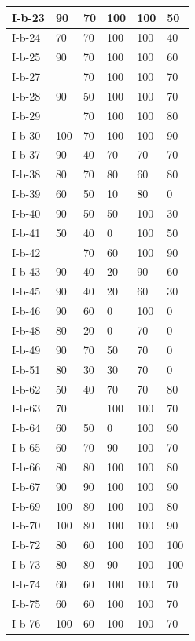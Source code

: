 \documentclass[11pt,a4paper]{article}
\begin{document}
\begin{table}[h]
\begin{tabular}{|l|l|l|l|l|l|}
I-b-23 & 90 & 70 & 100 & 100 & 50 \\ \hline
I-b-24 & 70 & 70 & 100 & 100 & 40 \\ \hline
I-b-25 & 90 & 70 & 100 & 100 & 60 \\ \hline
I-b-27 &  & 70 & 100 & 100 & 70 \\ \hline
I-b-28 & 90 & 50 & 100 & 100 & 70 \\ \hline
I-b-29 &  & 70 & 100 & 100 & 80 \\ \hline
I-b-30 & 100 & 70 & 100 & 100 & 90 \\ \hline
I-b-37 & 90 & 40 & 70 & 70 & 70 \\ \hline
I-b-38 & 80 & 70 & 80 & 60 & 80 \\ \hline
I-b-39 & 60 & 50 & 10 & 80 & 0 \\ \hline
I-b-40 & 90 & 50 & 50 & 100 & 30 \\ \hline
I-b-41 & 50 & 40 & 0 & 100 & 50 \\ \hline
I-b-42 &  & 70 & 60 & 100 & 90 \\ \hline
I-b-43 & 90 & 40 & 20 & 90 & 60 \\ \hline
I-b-45 & 90 & 40 & 20 & 60 & 30 \\ \hline
I-b-46 & 90 & 60 & 0 & 100 & 0 \\ \hline
I-b-48 & 80 & 20 & 0 & 70 & 0 \\ \hline
I-b-49 & 90 & 70 & 50 & 70 & 0 \\ \hline
I-b-51 & 80 & 30 & 30 & 70 & 0 \\ \hline
I-b-62 & 50 & 40 & 70 & 70 & 80 \\ \hline
I-b-63 & 70 &  & 100 & 100 & 70 \\ \hline
I-b-64 & 60 & 50 & 0 & 100 & 90 \\ \hline
I-b-65 & 60 & 70 & 90 & 100 & 70 \\ \hline
I-b-66 & 80 & 80 & 100 & 100 & 80 \\ \hline
I-b-67 & 90 & 90 & 100 & 100 & 90 \\ \hline
I-b-69 & 100 & 80 & 100 & 100 & 80 \\ \hline
I-b-70 & 100 & 80 & 100 & 100 & 90 \\ \hline
I-b-72 & 80 & 60 & 100 & 100 & 100 \\ \hline
I-b-73 & 80 & 80 & 90 & 100 & 100 \\ \hline
I-b-74 & 60 & 60 & 100 & 100 & 70 \\ \hline
I-b-75 & 60 & 60 & 100 & 100 & 70 \\ \hline
I-b-76 & 100 & 60 & 100 & 100 & 70 \\ \hline

\end{tabular}
\end{table}
\end{document}
